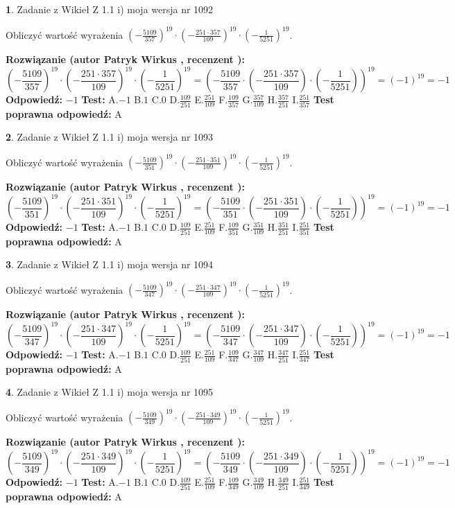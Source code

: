 \documentclass[12pt, a4paper]{article}
\theoremstyle{definition} %
\newtheorem{zad}{}
\newcommand{\zadStart}[1]{\begin{zad}#1\newline}
\newcommand{\zadStop}{\end{zad}}
\newcommand{\rozwStart}[2]{\noindent \textbf{Rozwiązanie (autor #1 , recenzent #2): }\newline}
\newcommand{\rozwStop}{\newline}
\newcommand{\odpStart}{\noindent \textbf{Odpowiedź:}\newline}
\newcommand{\odpStop}{\newline}
\newcommand{\testStart}{\noindent \textbf{Test:}\newline}
\newcommand{\testStop}{\newline}
\newcommand{\kluczStart}{\noindent \textbf{Test poprawna odpowiedź:}\newline}
\newcommand{\kluczStop}{\newline}
\begin{document}
\zadStart{Zadanie z Wikieł Z 1.1 i) moja wersja nr 1092}

Obliczyć wartość wyrażenia $(-\frac{5109}{357})^{19} \cdot (-\frac{251 \cdot 357}{109})^{19} \cdot (-\frac{1}{5251})^{19}$.
\zadStop
\rozwStart{Patryk Wirkus}{}
$$(-\frac{5109}{357})^{19} \cdot (-\frac{251 \cdot 357}{109})^{19} \cdot (-\frac{1}{5251})^{19} = (-\frac{5109}{357} \cdot (-\frac{251 \cdot 357}{109}) \cdot (-\frac{1}{5251}))^{19} = (-1)^{19} = -1$$
\rozwStop
\odpStart
$-1$
\odpStop
\testStart
A.$-1$ B.$1$ C.$0$ D.$\frac{109}{251}$ E.$\frac{251}{109}$
F.$\frac{109}{357}$ G.$\frac{357}{109}$
H.$\frac{357}{251}$
I.$\frac{251}{357}$
\testStop
\kluczStart
A
\kluczStop



\zadStart{Zadanie z Wikieł Z 1.1 i) moja wersja nr 1093}

Obliczyć wartość wyrażenia $(-\frac{5109}{351})^{19} \cdot (-\frac{251 \cdot 351}{109})^{19} \cdot (-\frac{1}{5251})^{19}$.
\zadStop
\rozwStart{Patryk Wirkus}{}
$$(-\frac{5109}{351})^{19} \cdot (-\frac{251 \cdot 351}{109})^{19} \cdot (-\frac{1}{5251})^{19} = (-\frac{5109}{351} \cdot (-\frac{251 \cdot 351}{109}) \cdot (-\frac{1}{5251}))^{19} = (-1)^{19} = -1$$
\rozwStop
\odpStart
$-1$
\odpStop
\testStart
A.$-1$ B.$1$ C.$0$ D.$\frac{109}{251}$ E.$\frac{251}{109}$
F.$\frac{109}{351}$ G.$\frac{351}{109}$
H.$\frac{351}{251}$
I.$\frac{251}{351}$
\testStop
\kluczStart
A
\kluczStop



\zadStart{Zadanie z Wikieł Z 1.1 i) moja wersja nr 1094}

Obliczyć wartość wyrażenia $(-\frac{5109}{347})^{19} \cdot (-\frac{251 \cdot 347}{109})^{19} \cdot (-\frac{1}{5251})^{19}$.
\zadStop
\rozwStart{Patryk Wirkus}{}
$$(-\frac{5109}{347})^{19} \cdot (-\frac{251 \cdot 347}{109})^{19} \cdot (-\frac{1}{5251})^{19} = (-\frac{5109}{347} \cdot (-\frac{251 \cdot 347}{109}) \cdot (-\frac{1}{5251}))^{19} = (-1)^{19} = -1$$
\rozwStop
\odpStart
$-1$
\odpStop
\testStart
A.$-1$ B.$1$ C.$0$ D.$\frac{109}{251}$ E.$\frac{251}{109}$
F.$\frac{109}{347}$ G.$\frac{347}{109}$
H.$\frac{347}{251}$
I.$\frac{251}{347}$
\testStop
\kluczStart
A
\kluczStop



\zadStart{Zadanie z Wikieł Z 1.1 i) moja wersja nr 1095}

Obliczyć wartość wyrażenia $(-\frac{5109}{349})^{19} \cdot (-\frac{251 \cdot 349}{109})^{19} \cdot (-\frac{1}{5251})^{19}$.
\zadStop
\rozwStart{Patryk Wirkus}{}
$$(-\frac{5109}{349})^{19} \cdot (-\frac{251 \cdot 349}{109})^{19} \cdot (-\frac{1}{5251})^{19} = (-\frac{5109}{349} \cdot (-\frac{251 \cdot 349}{109}) \cdot (-\frac{1}{5251}))^{19} = (-1)^{19} = -1$$
\rozwStop
\odpStart
$-1$
\odpStop
\testStart
A.$-1$ B.$1$ C.$0$ D.$\frac{109}{251}$ E.$\frac{251}{109}$
F.$\frac{109}{349}$ G.$\frac{349}{109}$
H.$\frac{349}{251}$
I.$\frac{251}{349}$
\testStop
\kluczStart
A
\kluczStop
\end{document}
